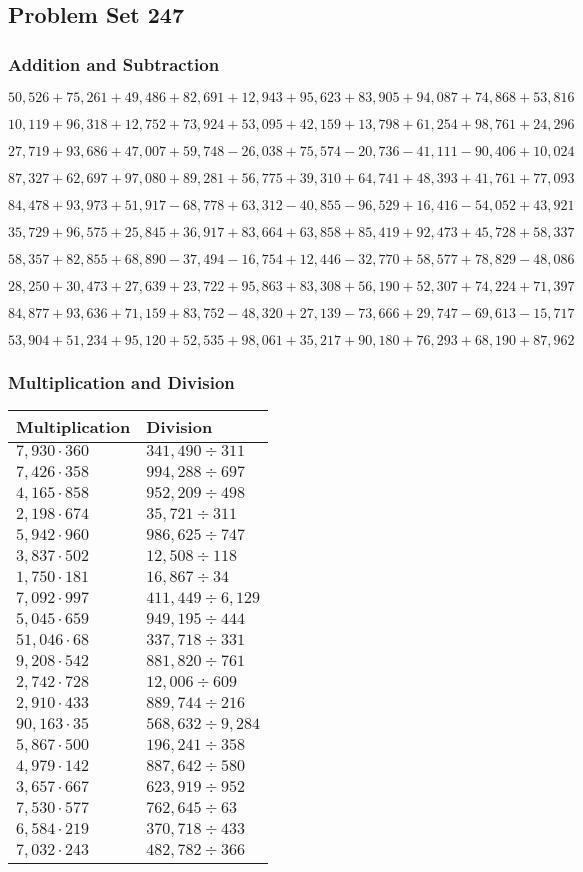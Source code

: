 \hypertarget{problem-set-247}{%
\subsection{Problem Set 247}\label{problem-set-247}}

\hypertarget{addition-and-subtraction}{%
\subsubsection{Addition and
Subtraction}\label{addition-and-subtraction}}

\(50,526+75,261+49,486+82,691+12,943+95,623+83,905+94,087+74,868+53,816\)

\(10,119+96,318+12,752+73,924+53,095+42,159+13,798+61,254+98,761+24,296\)

\(27,719+93,686+47,007+59,748-26,038+75,574-20,736-41,111-90,406+10,024\)

\(87,327+62,697+97,080+89,281+56,775+39,310+64,741+48,393+41,761+77,093\)

\(84,478+93,973+51,917-68,778+63,312-40,855-96,529+16,416-54,052+43,921\)

\(35,729+96,575+25,845+36,917+83,664+63,858+85,419+92,473+45,728+58,337\)

\(58,357+82,855+68,890-37,494-16,754+12,446-32,770+58,577+78,829-48,086\)

\(28,250+30,473+27,639+23,722+95,863+83,308+56,190+52,307+74,224+71,397\)

\(84,877+93,636+71,159+83,752-48,320+27,139-73,666+29,747-69,613-15,717\)

\(53,904+51,234+95,120+52,535+98,061+35,217+90,180+76,293+68,190+87,962\)

\hypertarget{multiplication-and-division}{%
\subsubsection{Multiplication and
Division}\label{multiplication-and-division}}

\begin{longtable}[]{@{}ll@{}}
\toprule
Multiplication & Division\tabularnewline
\midrule
\endhead
\(7,930\cdot360\) & \(341,490÷311\)\tabularnewline
\(7,426\cdot358\) & \(994,288÷697\)\tabularnewline
\(4,165\cdot858\) & \(952,209 ÷498\)\tabularnewline
\(2,198\cdot674\) & \(35,721÷311\)\tabularnewline
\(5,942\cdot960\) & \(986,625÷747\)\tabularnewline
\(3,837\cdot502\) & \(12,508÷118\)\tabularnewline
\(1,750\cdot181\) & \(16,867÷34\)\tabularnewline
\(7,092\cdot997\) & \(411,449÷6,129\)\tabularnewline
\(5,045\cdot659\) & \(949,195÷444\)\tabularnewline
\(51,046\cdot68\) & \(337,718÷331\)\tabularnewline
\(9,208\cdot542\) & \(881,820÷761\)\tabularnewline
\(2,742\cdot728\) & \(12,006÷609\)\tabularnewline
\(2,910\cdot433\) & \(889,744÷216\)\tabularnewline
\(90,163\cdot35\) & \(568,632÷9,284\)\tabularnewline
\(5,867\cdot500\) & \(196,241÷358\)\tabularnewline
\(4,979\cdot142\) & \(887,642÷580\)\tabularnewline
\(3,657\cdot667\) & \(623,919÷952\)\tabularnewline
\(7,530\cdot577\) & \(762,645÷63\)\tabularnewline
\(6,584\cdot219\) & \(370,718÷433\)\tabularnewline
\(7,032\cdot243\) & \(482,782÷366\)\tabularnewline
\bottomrule
\end{longtable}
